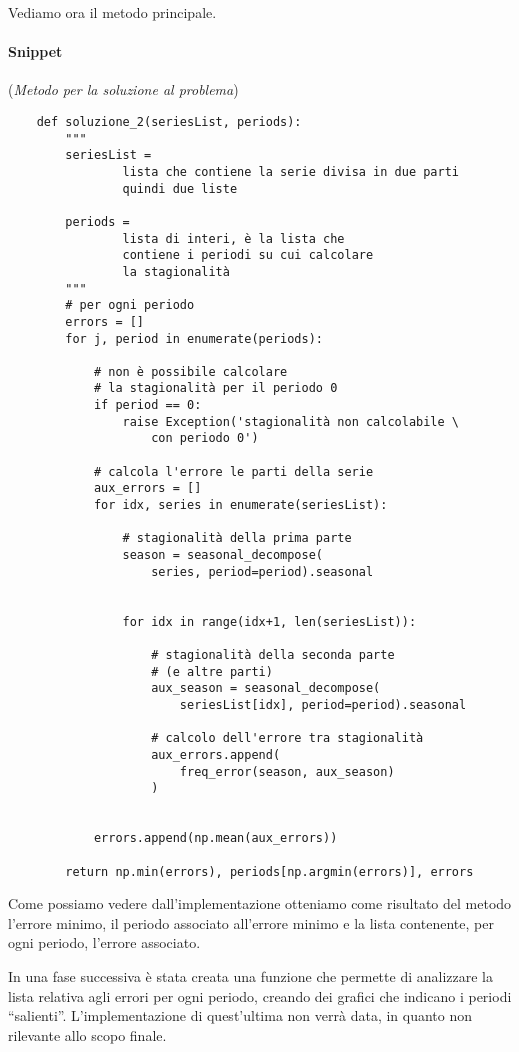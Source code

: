 Vediamo ora il metodo principale.
\paragraph*{Snippet} (\textit{Metodo per la soluzione al problema})
\begin{verbatim}
    def soluzione_2(seriesList, periods):
        """ 
        seriesList = 
                lista che contiene la serie divisa in due parti
                quindi due liste

        periods = 
                lista di interi, è la lista che
                contiene i periodi su cui calcolare
                la stagionalità
        """
        # per ogni periodo
        errors = []
        for j, period in enumerate(periods):

            # non è possibile calcolare 
            # la stagionalità per il periodo 0
            if period == 0:
                raise Exception('stagionalità non calcolabile \
                    con periodo 0')

            # calcola l'errore le parti della serie
            aux_errors = []
            for idx, series in enumerate(seriesList):

                # stagionalità della prima parte
                season = seasonal_decompose(
                    series, period=period).seasonal

                
                for idx in range(idx+1, len(seriesList)):

                    # stagionalità della seconda parte 
                    # (e altre parti)
                    aux_season = seasonal_decompose(
                        seriesList[idx], period=period).seasonal
                    
                    # calcolo dell'errore tra stagionalità
                    aux_errors.append(
                        freq_error(season, aux_season)
                    )
            

            errors.append(np.mean(aux_errors))

        return np.min(errors), periods[np.argmin(errors)], errors
\end{verbatim}

Come possiamo vedere dall'implementazione otteniamo come risultato del metodo l'errore minimo, il periodo
associato all'errore minimo e la lista contenente, per ogni periodo, l'errore associato.

In una fase successiva è stata creata una funzione che permette di analizzare la lista relativa
agli errori per ogni periodo, creando dei grafici che indicano i periodi ``salienti''. 
L'implementazione di quest'ultima non verrà data, in quanto non rilevante allo scopo finale.

